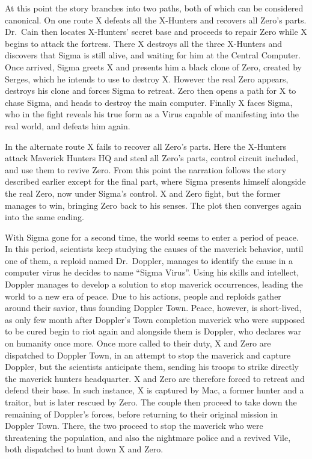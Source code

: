 At this point the story branches into two paths, both of which can be considered canonical. On one route X defeats all the X-Hunters and recovers all Zero's parts. Dr.~Cain then locates X-Hunters' secret base and proceeds to repair  Zero while X begins to attack the fortress. There X destroys all the three X-Hunters and discovers that Sigma is still alive, and waiting for him at the Central Computer. Once arrived, Sigma greets X and presents him a black clone of Zero, created by Serges, which he intends to use to destroy X. However the real Zero appears, destroys his clone and forces Sigma to retreat. Zero then opens a path for X to chase Sigma, and heads to destroy the main computer. Finally X faces Sigma, who in the fight reveals his true form as a Virus capable of manifesting into the real world, and defeats him again.

In the alternate route X fails to recover all Zero's parts. Here the X-Hunters attack Maverick Hunters HQ and steal all Zero's parts, control circuit included, and use them to revive Zero. From this point the narration follows the story described earlier except for the final part, where Sigma presents himself alongside the real Zero, now under Sigma's control. X and Zero fight, but the former manages to win, bringing Zero back to his senses. The plot then converges again into the same ending.

With Sigma gone for a second time, the world seems to enter a period of peace. In this period, scientists keep studying the causes of the maverick behavior, until one of them, a reploid named Dr.~Doppler, manages to identify the cause in a computer virus he decides to name ``Sigma Virus''. Using his skills and intellect, Doppler manages to develop a solution to stop maverick occurrences, leading the world to a new era of peace. Due to his actions, people and reploids gather around their savior, thus founding Doppler Town. Peace, however, is short-lived, as only few month after Doppler's Town completion maverick who were supposed to be cured begin to riot again and alongside them is Doppler, who declares war on humanity once more. Once more called to their duty, X and Zero are dispatched to Doppler Town, in an attempt to stop the maverick and capture Doppler, but the scientists anticipate them, sending his troops to strike directly the maverick hunters headquarter. X and Zero are therefore forced to retreat and defend their base. In such instance, X is captured by Mac, a former hunter and a traitor, but is later rescued by Zero. The couple then proceed to take down the remaining of Doppler's forces, before returning to their original mission in Doppler Town. There, the two proceed to stop the maverick who were threatening the population, and also the nightmare police and a revived Vile, both dispatched to hunt down X and Zero.

